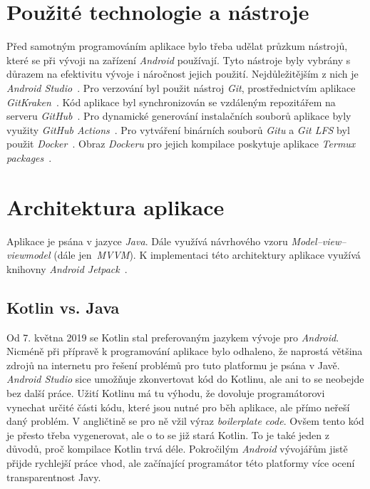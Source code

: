 \section{Použité technologie a nástroje}
Před samotným programováním aplikace bylo třeba udělat průzkum nástrojů, které se při vývoji na zařízení \emph{Android} používají. Tyto nástroje byly vybrány s důrazem na efektivitu vývoje i náročnost jejich použití. Nejdůležitějším z nich je \emph{Android Studio}~. Pro verzování byl použit nástroj \emph{Git}, prostřednictvím aplikace \emph{GitKraken}~. Kód aplikace byl synchronizován se vzdáleným repozitářem na serveru \emph{GitHub}~. Pro dynamické generování instalačních souborů aplikace byly využity \emph{GitHub Actions}~. Pro vytváření binárních souborů \emph{Gitu} a \emph{Git LFS} byl použit \emph{Docker}~. Obraz \emph{Dockeru} pro jejich kompilace poskytuje aplikace \emph{Termux packages}~\label{termux_packages}.

\section{Architektura aplikace}
Aplikace je psána v jazyce \emph{Java}. Dále využívá návrhového vzoru \emph{Model–view–viewmodel} (dále jen~\emph{MVVM}). K implementaci této architektury aplikace využívá knihovny \emph{Android Jetpack}~.

    \subsection{Kotlin vs. Java}
    Od 7. května 2019 se Kotlin stal preferovaným jazykem vývoje pro \emph{Android}. Nicméně při přípravě k programování aplikace bylo odhaleno, že naprostá většina zdrojů na internetu pro řešení problémů pro tuto platformu je psána v Javě. \emph{Android Studio} sice umožňuje zkonvertovat kód do Kotlinu, ale ani to se neobejde bez další práce. Užití Kotlinu má tu výhodu, že dovoluje programátorovi vynechat určité části kódu, které jsou nutné pro běh aplikace, ale přímo neřeší daný problém. V angličtině se pro ně vžil výraz \emph{boilerplate code}. Ovšem tento kód je přesto třeba vygenerovat, ale o to se již stará Kotlin. To je také jeden z důvodů, proč kompilace Kotlin trvá déle. Pokročilým \emph{Android} vývojářům jistě přijde rychlejší práce vhod, ale začínající programátor této platformy více ocení transparentnost Javy.


